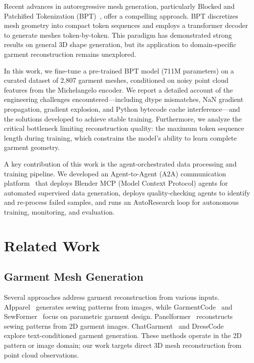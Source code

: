 \documentclass[conference]{IEEEtran}
\begin{document}
Recent advances in autoregressive mesh generation, particularly Blocked and Patchified Tokenization (BPT)~\cite{weng2024bpt}, offer a compelling approach.
BPT discretizes mesh geometry into compact token sequences and employs a transformer decoder to generate meshes token-by-token.
This paradigm has demonstrated strong results on general 3D shape generation, but its application to domain-specific garment reconstruction remains unexplored.

In this work, we fine-tune a pre-trained BPT model (711M parameters) on a curated dataset of 2,807 garment meshes, conditioned on noisy point cloud features from the Michelangelo encoder.
We report a detailed account of the engineering challenges encountered—including dtype mismatches, NaN gradient propagation, gradient explosion, and Python bytecode cache interference—and the solutions developed to achieve stable training.
Furthermore, we analyze the critical bottleneck limiting reconstruction quality: the maximum token sequence length during training, which constrains the model's ability to learn complete garment geometry.

A key contribution of this work is the agent-orchestrated data processing and training pipeline.
We developed an Agent-to-Agent (A2A) communication platform~\cite{yang2026a2a} that deploys Blender MCP (Model Context Protocol) agents for automated supervised data generation, deploys quality-checking agents to identify and re-process failed samples, and runs an AutoResearch loop for autonomous training, monitoring, and evaluation.

\section{Related Work}

\subsection{Garment Mesh Generation}

Several approaches address garment reconstruction from various inputs.
AIpparel~\cite{aipparel2024} generates sewing patterns from images, while GarmentCode~\cite{garmentcode2023} and SewFormer~\cite{sewformer2024} focus on parametric garment design.
Panelformer~\cite{panelformer2024} reconstructs sewing patterns from 2D garment images.
ChatGarment~\cite{chatgarment2025} and DressCode~\cite{dresscode2024} explore text-conditioned garment generation.
These methods operate in the 2D pattern or image domain; our work targets direct 3D mesh reconstruction from point cloud observations.
\end{document}
